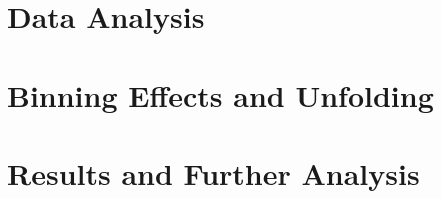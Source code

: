 \documentclass[12pt,twoside,vi]{mitthesis}
\begin{document}
\chapter{Data Analysis} \label{Chapter:BaseAnalysis}
    

\fi

\chapter{Binning Effects and Unfolding} \label{Chapter:Ch5_IBU}
    

\chapter{Results and Further Analysis} \label{Chapter:Further Analysis}
    

%



\printbibliography[heading=bibintoc]


%
\end{document}
